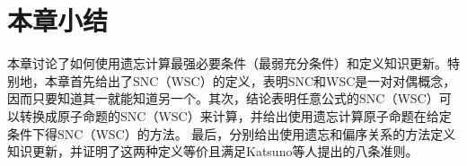\section{本章小结}\label{sec:chapter04-conclusion}

本章讨论了如何使用遗忘计算最强必要条件（最弱充分条件）和定义知识更新。特别地，本章首先给出了SNC（WSC）的定义，表明SNC和WSC是一对对偶概念，因而只要知道其一就能知道另一个。其次，结论表明任意公式的SNC（WSC）可以转换成原子命题的SNC（WSC）来计算，并给出使用遗忘计算原子命题在给定条件下得SNC（WSC）的方法。
最后，分别给出使用遗忘和偏序关系的方法定义知识更新，并证明了这两种定义等价且满足Katsuno等人提出的八条准则。

